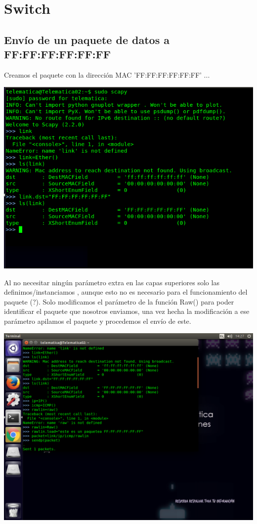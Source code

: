 \documentclass[spanish]{udpreport}
\begin{document}
\section{Switch}

\subsection{Envío de un paquete de datos a FF:FF:FF:FF:FF:FF}
Creamos el paquete con la dirección MAC 'FF:FF:FF:FF:FF:FF' ...

\begin{center}
	\includegraphics[scale=.37]{imagenes/Switch/Test_1a_b.png}
\end{center}

Al no necesitar ningún parámetro extra en las capas superiores solo las definimos/instanciamos , aunque esto no es necesario para el funcionamiento del paquete (?). Solo modificamos el parámetro de la función Raw() para poder identificar el paquete que nosotros enviamos, una vez hecha la modificación a ese parámetro apilamos el paquete y procedemos el envío de este.

\begin{center}
	\includegraphics[scale=.37]{imagenes/Switch/Test_1b.png}
\end{center} 
\end{document}
